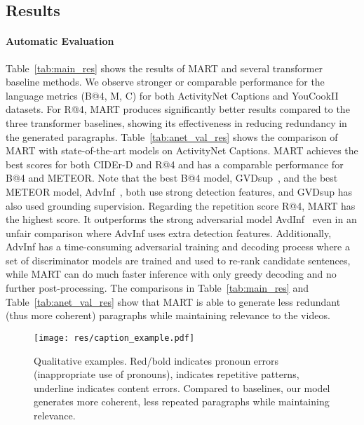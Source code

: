 \documentclass[11pt,a4paper]{article}
\begin{document}
\subsection{Results}\label{subsec:results}
\paragraph{Automatic Evaluation}
Table~\ref{tab:main_res} shows the results of MART and several transformer baseline methods. 
We observe stronger or comparable performance for the language metrics (B@4, M, C) for both ActivityNet Captions and YouCookII datasets.
For R@4, MART produces significantly better results compared to the three transformer baselines, showing its effectiveness in reducing redundancy in the generated paragraphs.
Table~\ref{tab:anet_val_res} shows the comparison of MART with state-of-the-art models on ActivityNet Captions. 
MART achieves the best scores for both CIDEr-D and R@4 and has a comparable performance for B@4 and METEOR. 
Note that the best B@4 model, GVDsup~\cite{Zhou2018GroundedVD}, and the best METEOR model, AdvInf~\cite{park2019adversarial}, both use strong detection features, and GVDsup has also used grounding supervision. 
Regarding the repetition score R@4, MART has the highest score. It outperforms the strong adversarial model AvdInf~\cite{park2019adversarial} even in an unfair comparison where AdvInf uses extra detection features. 
Additionally, AdvInf has a time-consuming adversarial training and decoding process where a set of discriminator models are trained and used to re-rank candidate sentences, while MART can do much faster inference with only greedy decoding and no further post-processing.
The comparisons in Table~\ref{tab:main_res} and Table~\ref{tab:anet_val_res} show that MART is able to generate less redundant (thus more coherent) paragraphs while maintaining relevance to the videos.


\begin{figure*}[!t]
  \centering
  \texttt{[image: res/caption\_example.pdf]}
  \caption{Qualitative examples. Red/bold indicates pronoun errors (inappropriate use of pronouns),  indicates repetitive patterns, underline indicates content errors. Compared to baselines, our model generates more coherent, less repeated paragraphs while maintaining relevance. 
  }
  \label{fig:caption_example}
\end{figure*} 
\end{document}
